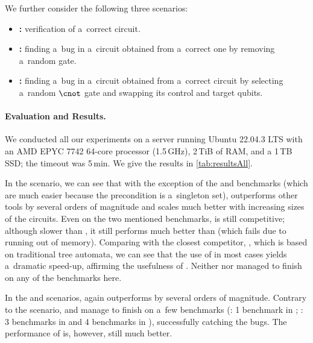 
\noindent
We further consider the following three scenarios:
%
\begin{itemize}
  \item  \textbf{\scenCorrect:} verification of a~correct circuit.
  \item  \textbf{\scenMissGate:} finding a~bug in a~circuit obtained from
    a~correct one by removing a~random gate.
  \item  \textbf{\scenFlipGate:} finding a~bug in a~circuit obtained from
    a~correct circuit by selecting a~random $\cnot$ gate and swapping its
    control and target qubits.
\end{itemize}


\paragraph{Evaluation and Results.}
We conducted all our experiments on a server running Ubuntu 22.04.3 LTS with an
AMD EPYC 7742 64-core processor (1.5\,GHz), 2\,TiB of RAM, and a 1\,TB SSD;
the timeout was 5\,min. 
We give the results in \cref{tab:resultsAll}.

In the \scenCorrect scenario, we can see that with the exception of the
\bvsingbench and \ghzsingbench benchmarks (which are much easier because the
precondition is a~singleton set), \tool outperforms other tools by several
orders of magnitude and scales much better with increasing sizes of the
circuits.
Even on the two mentioned benchmarks, \tool is still competitive; although slower than
\sliqsim, it still performs much better than \svsim (which fails due to running out of
memory).
Comparing \tool with the closest competitor, \autoq, which is based on traditional
tree automata, we can see that the use of \lstas in most cases yields a~dramatic
speed-up, affirming the usefulness of \lstas.
Neither \symqv nor \caal managed to finish on any of the benchmarks here.

In the \scenMissGate and \scenFlipGate scenarios, \tool again outperforms
\autoq by several orders of magnitude.
Contrary to the \correct scenario, \symqv and \caal manage to finish on a~few
benchmarks (\symqv: 1 benchmark in \scenMissGate; \caal: 3 benchmarks in
\scenMissGate and 4 benchmarks in \scenFlipGate), successfully catching the
bugs.
The performance of \tool is, however, still much better.




